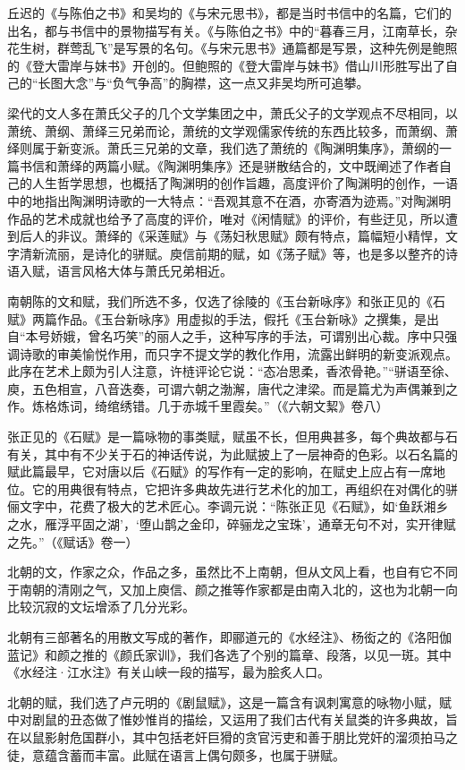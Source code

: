 丘迟的《与陈伯之书》和吴均的《与宋元思书》，都是当时书信中的名篇，它们的出名，都与书信中的景物描写有关。《与陈伯之书》中的“暮春三月，江南草长，杂花生树，群莺乱飞”是写景的名句。《与宋元思书》通篇都是写景，这种先例是鲍照的《登大雷岸与妹书》开创的。但鲍照的《登大雷岸与妹书》借山川形胜写出了自己的“长图大念”与“负气争高”的胸襟，这一点又非吴均所可追攀。

梁代的文人多在萧氏父子的几个文学集团之中，萧氏父子的文学观点不尽相同，以萧统、萧纲、萧绎三兄弟而论，萧统的文学观儒家传统的东西比较多，而萧纲、萧绎则属于新变派。萧氏三兄弟的文章，我们选了萧统的《陶渊明集序》，萧纲的一篇书信和萧绎的两篇小赋。《陶渊明集序》还是骈散结合的，文中既阐述了作者自己的人生哲学思想，也概括了陶渊明的创作旨趣，高度评价了陶渊明的创作，一语中的地指出陶渊明诗歌的一大特点：“吾观其意不在酒，亦寄酒为迹焉。”对陶渊明作品的艺术成就也给予了高度的评价，唯对《闲情赋》的评价，有些迂见，所以遭到后人的非议。萧绎的《采莲赋》与《荡妇秋思赋》颇有特点，篇幅短小精悍，文字清新流丽，是诗化的骈赋。庾信前期的赋，如《荡子赋》等，也是多以整齐的诗语入赋，语言风格大体与萧氏兄弟相近。

南朝陈的文和赋，我们所选不多，仅选了徐陵的《玉台新咏序》和张正见的《石赋》两篇作品。《玉台新咏序》用虚拟的手法，假托《玉台新咏》之撰集，是出自“本号娇娥，曾名巧笑”的丽人之手，这种写序的手法，可谓别出心裁。序中只强调诗歌的审美愉悦作用，而只字不提文学的教化作用，流露出鲜明的新变派观点。此序在艺术上颇为引人注意，许梿评论它说：“态冶思柔，香浓骨艳。”“骈语至徐、庾，五色相宣，八音迭奏，可谓六朝之渤澥，唐代之津梁。而是篇尤为声偶兼到之作。炼格炼词，绮绾绣错。几于赤城千里霞矣。”（《六朝文絜》卷八）

张正见的《石赋》是一篇咏物的事类赋，赋虽不长，但用典甚多，每个典故都与石有关，其中有不少关于石的神话传说，为此赋披上了一层神奇的色彩。以石名篇的赋此篇最早，它对唐以后《石赋》的写作有一定的影响，在赋史上应占有一席地位。它的用典很有特点，它把许多典故先进行艺术化的加工，再组织在对偶化的骈俪文字中，花费了极大的艺术匠心。李调元说：“陈张正见《石赋》，如‘鱼跃湘乡之水，雁浮平固之湖’，‘堕山鹊之金印，碎骊龙之宝珠’，通章无句不对，实开律赋之先。”（《赋话》卷一）

北朝的文，作家之众，作品之多，虽然比不上南朝，但从文风上看，也自有它不同于南朝的清刚之气，又加上庾信、颜之推等作家都是由南入北的，这也为北朝一向比较沉寂的文坛增添了几分光彩。

北朝有三部著名的用散文写成的著作，即郦道元的《水经注》、杨衒之的《洛阳伽蓝记》和颜之推的《颜氏家训》，我们各选了个别的篇章、段落，以见一斑。其中《水经注·江水注》有关山峡一段的描写，最为脍炙人口。

北朝的赋，我们选了卢元明的《剧鼠赋》，这是一篇含有讽刺寓意的咏物小赋，赋中对剧鼠的丑态做了惟妙惟肖的描绘，又运用了我们古代有关鼠类的许多典故，旨在以鼠影射危国群小，其中包括老奸巨猾的贪官污吏和善于朋比党奸的溜须拍马之徒，意蕴含蓄而丰富。此赋在语言上偶句颇多，也属于骈赋。

